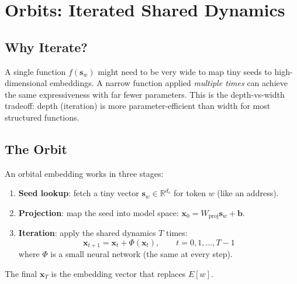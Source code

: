 \documentclass[11pt, a4paper]{article}
\newcommand{\x}{\mathbf{x}}
\newcommand{\s}{\mathbf{s}}
\newcommand{\R}{\mathbb{R}}
\theoremstyle{remark}
\begin{document}
\section{Orbits: Iterated Shared Dynamics}
\label{sec:orbits}

\subsection{Why Iterate?}

A single function $f(\s_w)$ might need to be very wide to map tiny seeds to high-dimensional embeddings.
A narrow function applied \emph{multiple times} can achieve the same expressiveness with far fewer parameters.
This is the depth-vs-width tradeoff: depth (iteration) is more parameter-efficient than width for most structured functions.

\subsection{The Orbit}

An orbital embedding works in three stages:
\begin{enumerate}[nosep]
    \item \textbf{Seed lookup}: fetch a tiny vector $\s_w \in \R^{d_s}$ for token $w$ (like an address).
    \item \textbf{Projection}: map the seed into model space: $\x_0 = W_{\text{proj}} \s_w + \mathbf{b}$.
    \item \textbf{Iteration}: apply the shared dynamics $T$ times:
    \[
        \x_{t+1} = \x_t + \Phi(\x_t), \qquad t = 0, 1, \ldots, T{-}1
    \]
    where $\Phi$ is a small neural network (the same at every step).
\end{enumerate}
The final $\x_T$ is the embedding vector that replaces $E[w]$.
\end{document}
